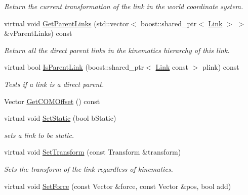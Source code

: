 \begin{DoxyCompactItemize}
\begin{DoxyCompactList}\small\item\em Return the current transformation of the link in the world coordinate system. \item\end{DoxyCompactList}\item 
virtual void \hyperlink{classOpenRAVE_1_1KinBody_1_1Link_a975b50117973af79adde0411409e1cea}{GetParentLinks} (std::vector$<$ boost::shared\_\-ptr$<$ \hyperlink{classOpenRAVE_1_1KinBody_1_1Link}{Link} $>$ $>$ \&vParentLinks) const 
\begin{DoxyCompactList}\small\item\em Return all the direct parent links in the kinematics hierarchy of this link. \item\end{DoxyCompactList}\item 
virtual bool \hyperlink{classOpenRAVE_1_1KinBody_1_1Link_a5cda3b918d179bac6174b1114ba930fe}{IsParentLink} (boost::shared\_\-ptr$<$ \hyperlink{classOpenRAVE_1_1KinBody_1_1Link}{Link} const  $>$ plink) const 
\begin{DoxyCompactList}\small\item\em Tests if a link is a direct parent. \item\end{DoxyCompactList}\item 
Vector \hyperlink{classOpenRAVE_1_1KinBody_1_1Link_a2e9a0c247f0f9d1c47b78a745268a98e}{GetCOMOffset} () const 
\item 
virtual void \hyperlink{classOpenRAVE_1_1KinBody_1_1Link_ad2869657aaca15eb379f92e506206a15}{SetStatic} (bool bStatic)
\begin{DoxyCompactList}\small\item\em sets a link to be static. \item\end{DoxyCompactList}\item 
virtual void \hyperlink{classOpenRAVE_1_1KinBody_1_1Link_a92abef33e0bc4eca1756178c31e18645}{SetTransform} (const Transform \&transform)
\begin{DoxyCompactList}\small\item\em Sets the transform of the link regardless of kinematics. \item\end{DoxyCompactList}\item 
virtual void \hyperlink{classOpenRAVE_1_1KinBody_1_1Link_a36916dd947512e36587e4ecfbf26887c}{SetForce} (const Vector \&force, const Vector \&pos, bool add)

\end{DoxyCompactItemize}
